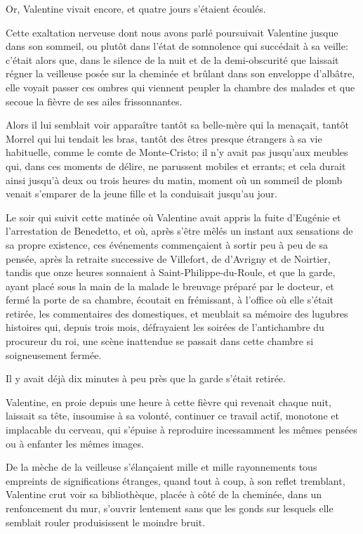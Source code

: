 Or, Valentine vivait encore, et quatre jours s'étaient écoulés. 

Cette exaltation nerveuse dont nous avons parlé poursuivait Valentine jusque dans son sommeil, ou plutôt dans l'état de somnolence qui succédait à sa veille: c'était alors que, dans le silence de la nuit et de la demi-obscurité que laissait régner la veilleuse posée sur la cheminée et brûlant dans son enveloppe d'albâtre, elle voyait passer ces ombres qui viennent peupler la chambre des malades et que secoue la fièvre de ses ailes frissonnantes. 

Alors il lui semblait voir apparaître tantôt sa belle-mère qui la menaçait, tantôt Morrel qui lui tendait les bras, tantôt des êtres presque étrangers à sa vie habituelle, comme le comte de Monte-Cristo; il n'y avait pas jusqu'aux meubles qui, dans ces moments de délire, ne parussent mobiles et errants; et cela durait ainsi jusqu'à deux ou trois heures du matin, moment où un sommeil de plomb venait s'emparer de la jeune fille et la conduisait jusqu'au jour. 

Le soir qui suivit cette matinée où Valentine avait appris la fuite d'Eugénie et l'arrestation de Benedetto, et où, après s'être mêlés un instant aux sensations de sa propre existence, ces événements commençaient à sortir peu à peu de sa pensée, après la retraite successive de Villefort, de d'Avrigny et de Noirtier, tandis que onze heures sonnaient à Saint-Philippe-du-Roule, et que la garde, ayant placé sous la main de la malade le breuvage préparé par le docteur, et fermé la porte de sa chambre, écoutait en frémissant, à l'office où elle s'était retirée, les commentaires des domestiques, et meublait sa mémoire des lugubres histoires qui, depuis trois mois, défrayaient les soirées de l'antichambre du procureur du roi, une scène inattendue se passait dans cette chambre si soigneusement fermée. 

Il y avait déjà dix minutes à peu près que la garde s'était retirée. 

Valentine, en proie depuis une heure à cette fièvre qui revenait chaque nuit, laissait sa tête, insoumise à sa volonté, continuer ce travail actif, monotone et implacable du cerveau, qui s'épuise à reproduire incessamment les mêmes pensées ou à enfanter les mêmes images. 

De la mèche de la veilleuse s'élançaient mille et mille rayonnements tous empreints de significations étranges, quand tout à coup, à son reflet tremblant, Valentine crut voir sa bibliothèque, placée à côté de la cheminée, dans un renfoncement du mur, s'ouvrir lentement sans que les gonds sur lesquels elle semblait rouler produisissent le moindre bruit. 

